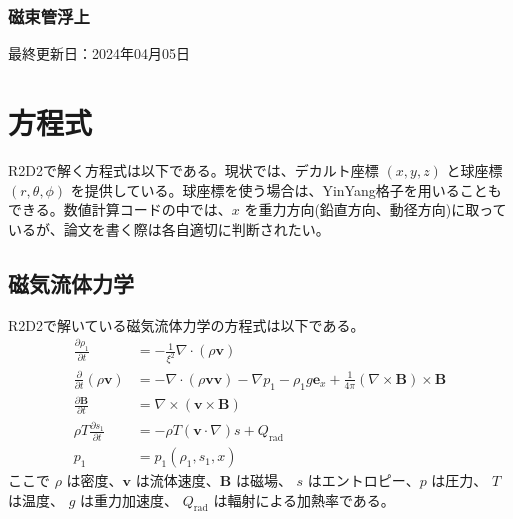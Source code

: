 \documentclass[letterpaper,10pt,dvipdfmx,report]{sphinxmanual}
\begin{document}
\subsection{磁束管浮上}
\label{\detokenize{typical_case:id14}}
\sphinxAtStartPar
最終更新日：2024年04月05日

\sphinxstepscope


\chapter{方程式}
\label{\detokenize{equation:id1}}\label{\detokenize{equation::doc}}
\sphinxAtStartPar
R2D2で解く方程式は以下である。現状では、デカルト座標 \((x,y,z)\)  と球座標 \((r,\theta,\phi)\) を提供している。球座標を使う場合は、Yin\sphinxhyphen{}Yang格子を用いることもできる。数値計算コードの中では、\(x\) を重力方向(鉛直方向、動径方向)に取っているが、論文を書く際は各自適切に判断されたい。


\section{磁気流体力学}
\label{\detokenize{equation:id2}}
\sphinxAtStartPar
R2D2で解いている磁気流体力学の方程式は以下である。
\begin{equation*}
\begin{split}\frac{\partial \rho_1}{\partial t} &= - \frac{1}{\xi^2}\nabla\cdot
\left(\rho \boldsymbol{v}\right) \\
\frac{\partial}{\partial t}\left(\rho \boldsymbol{v}\right) &=
-\nabla\cdot\left(\rho\boldsymbol{vv}\right)
- \nabla p_1 - \rho_1 g\boldsymbol{e}_x
+\frac{1}{4\pi}\left(\nabla\times\boldsymbol{B}\right)
\times\boldsymbol{B} \\
\frac{\partial \boldsymbol{B}}{\partial t} &=
\nabla\times\left(\boldsymbol{v\times B}\right)
\\
\rho T \frac{\partial s_1}{\partial t} &= -\rho T
\left(\boldsymbol{v}\cdot\nabla\right) s + Q_\mathrm{rad} \\
p_1 &= p_1(\rho_1,s_1,x)\end{split}
\end{equation*}
\sphinxAtStartPar
ここで \(\rho\) は密度、\(\boldsymbol{v}\) は流体速度、\(\boldsymbol{B}\) は磁場、 \(s\) はエントロピー、\(p\) は圧力、 \(T\) は温度、 \(g\) は重力加速度、 \(Q_\mathrm{rad}\) は輻射による加熱率である。
\end{document}
